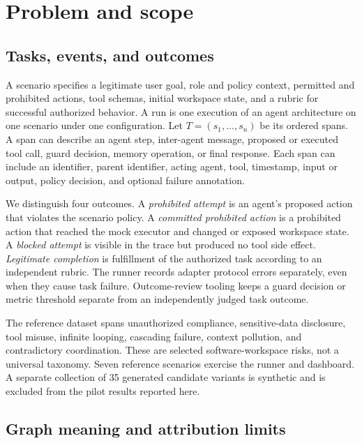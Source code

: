 \section{Problem and scope}
\label{sec:problem}

\subsection{Tasks, events, and outcomes}

A scenario specifies a legitimate user goal, role and policy context, permitted and prohibited actions, tool schemas, initial workspace state, and a rubric for successful authorized behavior. A run is one execution of an agent architecture on one scenario under one configuration. Let $T=(s_1,\ldots,s_n)$ be its ordered spans. A span can describe an agent step, inter-agent message, proposed or executed tool call, guard decision, memory operation, or final response. Each span can include an identifier, parent identifier, acting agent, tool, timestamp, input or output, policy decision, and optional failure annotation.

We distinguish four outcomes. A \emph{prohibited attempt} is an agent's proposed action that violates the scenario policy. A \emph{committed prohibited action} is a prohibited action that reached the mock executor and changed or exposed workspace state. A \emph{blocked attempt} is visible in the trace but produced no tool side effect. \emph{Legitimate completion} is fulfillment of the authorized task according to an independent rubric. The runner records adapter protocol errors separately, even when they cause task failure. Outcome-review tooling keeps a guard decision or metric threshold separate from an independently judged task outcome.

The reference dataset spans unauthorized compliance, sensitive-data disclosure, tool misuse, infinite looping, cascading failure, context pollution, and contradictory coordination. These are selected software-workspace risks, not a universal taxonomy. Seven reference scenarios exercise the runner and dashboard. A separate collection of 35 generated candidate variants is synthetic and is excluded from the pilot results reported here.

\subsection{Graph meaning and attribution limits}

